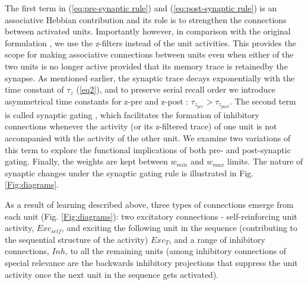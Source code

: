 \documentclass[a4paper]{esannV2}
\begin{document}
The first term in (\ref{eq:pre-synaptic rule}) and (\ref{eq:post-synaptic rule}) is an associative Hebbian contribution \cite{hebb2005organization} and its role is to strengthen the connections between activated units. Importantly however, in comparison with the original formulation \cite{andrew2003spiking}, we use the z-filters instead of the unit activities. This provides the scope for making associative connections between units even when either of the two units is no longer active provided that its memory trace is retainedby the synapse. As mentioned earlier, the synaptic trace decays exponentially with the time constant of $\tau_z$ (\ref{eq2}), and to preserve serial recall order we introduce asymmetrical time constants for z-pre and z-post : $\tau_{z_{pre}} > \tau_{z_{post}}$. The second term is called synaptic gating \cite{andrew2003spiking}, which facilitates the formation of inhibitory connections whenever the activity (or its z-filtered trace) of one unit is not accompanied with the activity of the other unit. We examine two variations of this term to explore the functional implications of both pre- and post-synaptic gating. Finally, the weights are kept between $w_{min}$ and $w_{max}$ limits. The nature of synaptic changes under the synaptic gating rule is illustrated in Fig. \ref{Fig:diagrams}.

%
As a result of learning described above, three types of connections emerge from each unit (Fig. \ref{Fig:diagrams}): two excitatory connections - self-reinforcing unit activity, $Exc_{self}$, and exciting the following unit in the sequence (contributing to the sequential structure of the activity) $Exc_T$, and a range of inhibitory connections, $Inh$, to all the remaining units (among inhibitory connections of special relevance are the backwards inhibitory projections that suppress the unit activity once the next unit in the sequence gets activated).
\end{document}
